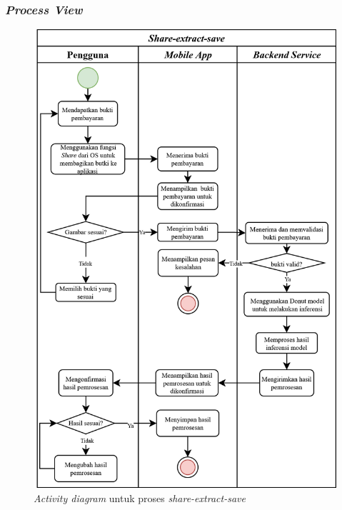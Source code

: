 \subsubsection{\emph{Process View}}
\label{subsubsec:process-view}

\begin{figure}[htbp]
    \centering
    \includegraphics[width=.90625\textwidth]{images/activity-diagram.png}
    \caption{\emph{Activity diagram} untuk proses \emph{share-extract-save}}
    \label{fig:activity-diagram}
\end{figure}

